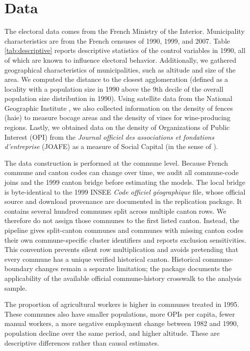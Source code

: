 \section{Data} \label{data-section}

The electoral data comes from the French Ministry of the Interior. Municipality characteristics are from the French censuses of 1990, 1999, and 2007. Table \ref{tab:descriptive} reports descriptive statistics of the control variables in 1990, all of which are known to influence electoral behavior. Additionally, we gathered geographical characteristics of municipalities, such as altitude and size of the area. We computed the distance to the closest agglomeration (defined as a locality with a population size in 1990 above the 9th decile of the overall population size distribution in 1990). Using satellite data from the National Geographic Institute \citep{IGN2020}, we also collected information on the density of fences (haie) to measure bocage areas and the density of vines for wine-producing regions. Lastly, we obtained data on the density of Organizations of Public Interest (OPI) from the \textit{Journal officiel des associations et fondations d'entreprise} (JOAFE) as a measure of Social Capital (in the sense of \cite{putnam2000}).

The data construction is performed at the commune level. Because French commune and canton codes can change over time, we audit all commune-code joins and the 1999 canton bridge before estimating the models. The local bridge is byte-identical to the 1999 INSEE \textit{Code officiel géographique} file, whose official source and download provenance are documented in the replication package. It contains several hundred communes split across multiple canton rows. We therefore do not assign those communes to the first listed canton. Instead, the pipeline gives split-canton communes and communes with missing canton codes their own commune-specific cluster identifiers and reports exclusion sensitivities. This convention prevents silent row multiplication and avoids pretending that every commune has a unique verified historical canton. Historical commune-boundary changes remain a separate limitation; the package documents the applicability of the available official commune-history crosswalk to the analysis sample.




The proportion of agricultural workers is higher in communes treated in 1995. These communes also have smaller populations, more OPIs per capita, fewer manual workers, a more negative employment change between 1982 and 1990, population decline over the same period, and higher altitude. These are descriptive differences rather than causal estimates.
